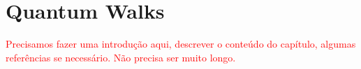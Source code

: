 	\chapter{Quantum Walks}
            \textcolor{red}{Precisamos fazer uma introdução aqui, descrever o conteúdo do capítulo, algumas referências se necessário. Não precisa ser muito longo.}
	    
	    
	    
	    
